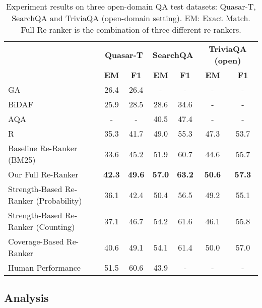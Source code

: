 \documentclass{article} \usepackage{iclr2018_conference,times}
\begin{document}
\begin{table*}[t]
\centering
\begin{tabular}{lcccccc}
\toprule
                  & \multicolumn{2}{c}{\bf Quasar-T} & \multicolumn{2}{c}{\bf SearchQA} & \multicolumn{2}{c}{\bf TriviaQA (open)}\\
                  & \bf EM            & \bf F1            & \bf EM            & \bf F1 & \bf EM            & \bf F1 \\
\midrule
GA~\citep{dhingra2016gated}               & 26.4          & 26.4          & -             & -  & -             & - \\
BiDAF~\citep{seo2016bidirectional}           & 25.9          & 28.5          & 28.6             & 34.6  & -             & - \\
AQA~\citep{buck2017ask}           & -          & -          & 40.5             & 47.4  & -             & - \\

R~\citep{wang2017r}             & 35.3 & 41.7 &49.0 &55.3  & 47.3             & 53.7\\
\midrule
Baseline Re-Ranker (BM25) & 33.6 & 45.2 & 51.9 & 60.7  & 44.6 &       55.7        \\
 \midrule
Our Full Re-Ranker  &  \textbf{42.3} & \textbf{49.6} & \textbf{57.0} & \textbf{63.2}   & \textbf{50.6}             & \textbf{57.3} \\
\quad Strength-Based Re-Ranker (Probability) & 36.1 & 42.4 & 50.4 & 56.5 & 49.2             & 55.1\\
\quad Strength-Based Re-Ranker (Counting)      & 37.1         & 46.7          & 54.2 & 61.6       & 46.1             & 55.8\\
\quad Coverage-Based Re-Ranker  & 40.6 & 49.1 & 54.1 & 61.4   & 50.0            & 57.0  \\
\midrule
 Human Performance & 51.5 &60.6 &43.9 & - & - & -\\
\bottomrule
\end{tabular}
\normalsize
\caption[Caption for LOF]{Experiment results on three open-domain QA test datasets: Quasar-T, SearchQA and TriviaQA (open-domain setting). EM: Exact Match.  Full Re-ranker is the combination of three different re-rankers.}
\label{tab:results}
\end{table*}



\subsection{Analysis}
\end{document}
